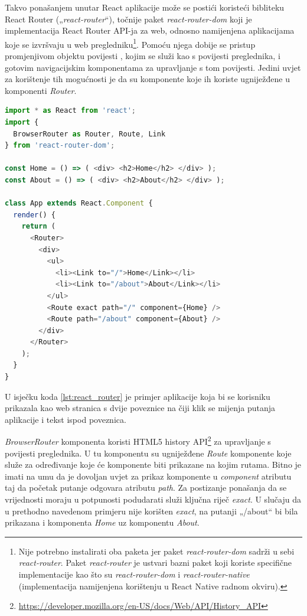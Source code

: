 \documentclass[times, utf8, diplomski, numeric]{fer}
\newcommand{\razmakp}{\vspace{18pt}}
\newcommand{\razmaks}{\vspace{10pt}}
\begin{document}
Takvo ponašanjem unutar React aplikacije može se postići koristeći bibliteku React Router („\emph{react-router}“), točnije paket \emph{react-router-dom} koji je implementacija React Router API-ja za web, odnosno namijenjena aplikacijama koje se izvršvaju u web pregledniku\footnote{
    Nije potrebno instalirati oba paketa jer paket \emph{react-router-dom} sadrži u sebi \emph{react-router}.
    Paket \emph{react-router} je ustvari bazni paket koji koriste specifične implementacije kao što su \emph{react-router-dom} i \emph{react-router-native} (implementacija namijenjena korištenju u React Native radnom okviru).
}.
Pomoću njega dobije se pristup promjenjivom objektu povijesti , kojim se služi kao s povijesti preglednika, i gotovim navigacijskim komponentama za upravljanje s tom povijesti.
Jedini uvjet za korištenje tih mogućnosti je da su komponente koje ih koriste ugniježđene u komponenti \emph{Router}\citep{react_router}.

\razmakp %
\begin{lstlisting}[language=JavaScript, caption={Primjer korištenja React Router biblioteke}, label={lst:react_router}]
import * as React from 'react';
import {
  BrowserRouter as Router, Route, Link
} from 'react-router-dom';

const Home = () => ( <div> <h2>Home</h2> </div> );
const About = () => ( <div> <h2>About</h2> </div> );

class App extends React.Component {
  render() {
    return (
      <Router>
        <div>
          <ul>
            <li><Link to="/">Home</Link></li>
            <li><Link to="/about">About</Link></li>
          </ul>
          <Route exact path="/" component={Home} />
          <Route path="/about" component={About} />
        </div>
      </Router>
    );
  }
}
\end{lstlisting}
\razmaks

U isječku koda \ref{lst:react_router} je primjer aplikacije koja bi se korisniku prikazala kao web stranica s dvije poveznice na čiji klik se mijenja putanja aplikacije i tekst ispod poveznica.

\emph{BrowserRouter} komponenta koristi HTML5 history API\footnote{\url{https://developer.mozilla.org/en-US/docs/Web/API/History_API}} za upravljanje s povijesti preglednika.
U tu komponentu su ugniježđene \emph{Route} komponente koje služe za određivanje koje će komponente biti prikazane na kojim rutama.
Bitno je imati na umu da je dovoljan uvjet za prikaz komponente u \emph{component} atributu taj da početak putanje odgovara atributu \emph{path}.
Za postizanje ponašanja da se vrijednosti moraju u potpunosti podudarati služi ključna riječ \emph{exact}.
U slučaju da u prethodno navedenom primjeru nije korišten \emph{exact}, na putanji „/about“ bi bila prikazana i komponenta \emph{Home} uz komponentu \emph{About}.
\end{document}
